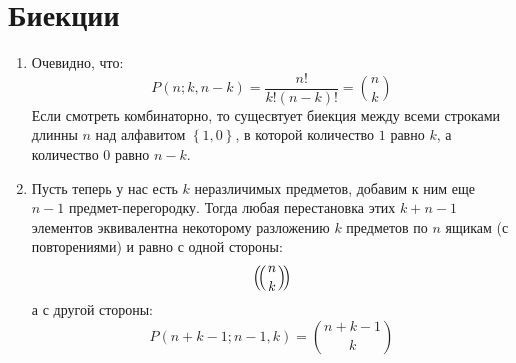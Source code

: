 \section{Биекции}

\begin{enumerate}
\item Очевидно, что: $$ P\left(n; k, n-k\right) = \frac{n!}{k!\left(n-k\right)!} = \binom{n}{k}$$ Если смотреть комбинаторно, то сущесвтует биекция между всеми строками длинны $n$ над алфавитом $\left\{1, 0\right\}$, в которой количество $1$ равно $k$, а количество $0$ равно $n-k$.

\item Пусть теперь у нас есть $k$ неразличимых предметов, добавим к ним еще $n-1$ предмет-перегородку. Тогда любая перестановка этих $k+n-1$ элементов эквивалентна некоторому разложению $k$ предметов по $n$ ящикам (с повторениями) и равно с одной стороны: $$ \left(\negmedspace\left({{n}\atop{k}}\right)\negmedspace\right) $$ а с другой стороны: $$ P\left(n+k-1; n-1, k\right) = \binom{n+k-1}{k} $$
\end{enumerate}

